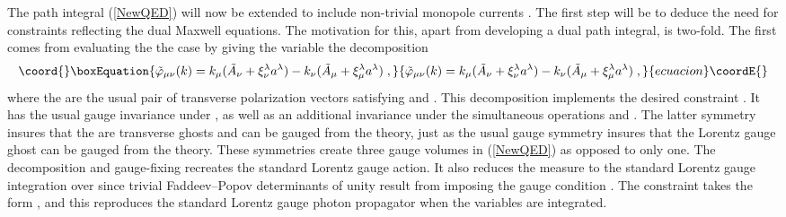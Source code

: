 \documentclass[a4paper,a4paper]{article}
\begin{document}
The path integral (\ref{NewQED}) will now be extended to include non-trivial monopole currents \coordHE{}.  The first step will be to deduce the need for constraints reflecting the dual Maxwell equations. The motivation for this, apart from developing a dual path integral, is two-fold. The first comes from evaluating the  the case \coordHE{} by giving the variable \myHighlight{$\tilde{\varphi}$}\coordHE{} the decomposition
\begin{equation}\coord{}\boxEquation{
\label{NoMonopole}
\tilde{\varphi}_{\mu \nu} (k)  =   k_\mu ( \tilde{A}_\nu  + \xi^\lambda_\nu a^\lambda )  - k_\nu (  \tilde{A}_\mu  + \xi^\lambda_\mu a^\lambda ) \; ,
}{
\tilde{\varphi}_{\mu \nu} (k)  =   k_\mu ( \tilde{A}_\nu  + \xi^\lambda_\nu a^\lambda )  - k_\nu (  \tilde{A}_\mu  + \xi^\lambda_\mu a^\lambda ) \; ,
}{ecuacion}\coordE{}\end{equation}
where the \myHighlight{$\xi^\lambda$}\coordHE{} are the usual pair of transverse polarization vectors satisfying \coordHE{} and \myHighlight{$\xi_\mu^\lambda \xi^{\mu \lambda^\prime} = - \delta^{\lambda \lambda^\prime}$}\coordHE{}.  This decomposition implements the desired constraint \coordHE{}. It has the usual gauge invariance under \coordHE{}, as well as an additional invariance under the simultaneous operations \coordHE{} and \coordHE{}.  The latter symmetry insures that the \coordHE{} are transverse ghosts and can be gauged from the theory, just as the usual gauge symmetry insures that the Lorentz gauge ghost \coordHE{} can be gauged from the theory.  These symmetries create three gauge volumes in (\ref{NewQED}) as opposed to only one. The decomposition and gauge-fixing recreates the standard Lorentz gauge action. It also reduces the measure to the standard Lorentz gauge integration over \coordHE{} since trivial Faddeev--Popov determinants of unity result from imposing the gauge condition \coordHE{}.  The constraint takes the form \coordHE{}, and this reproduces the standard Lorentz gauge photon propagator when the \coordHE{} variables are integrated. 
\end{document}
